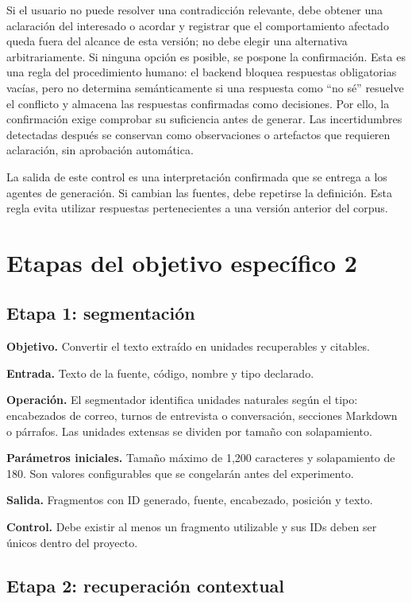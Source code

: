 Si el usuario no puede resolver una contradicción relevante, debe obtener una aclaración del interesado o acordar y registrar que el comportamiento afectado queda fuera del alcance de esta versión; no debe elegir una alternativa arbitrariamente. Si ninguna opción es posible, se pospone la confirmación. Esta es una regla del procedimiento humano: el backend bloquea respuestas obligatorias vacías, pero no determina semánticamente si una respuesta como ``no sé'' resuelve el conflicto y almacena las respuestas confirmadas como decisiones. Por ello, la confirmación exige comprobar su suficiencia antes de generar. Las incertidumbres detectadas después se conservan como observaciones o artefactos que requieren aclaración, sin aprobación automática.

La salida de este control es una interpretación confirmada que se entrega a los agentes de generación. Si cambian las fuentes, debe repetirse la definición. Esta regla evita utilizar respuestas pertenecientes a una versión anterior del corpus.

\section{Etapas del objetivo específico 2}

\subsection{Etapa 1: segmentación}

\textbf{Objetivo.} Convertir el texto extraído en unidades recuperables y citables.

\textbf{Entrada.} Texto de la fuente, código, nombre y tipo declarado.

\textbf{Operación.} El segmentador identifica unidades naturales según el tipo: encabezados de correo, turnos de entrevista o conversación, secciones Markdown o párrafos. Las unidades extensas se dividen por tamaño con solapamiento.

\textbf{Parámetros iniciales.} Tamaño máximo de 1,200 caracteres y solapamiento de 180. Son valores configurables que se congelarán antes del experimento.

\textbf{Salida.} Fragmentos con ID generado, fuente, encabezado, posición y texto.

\textbf{Control.} Debe existir al menos un fragmento utilizable y sus IDs deben ser únicos dentro del proyecto.

\subsection{Etapa 2: recuperación contextual}

